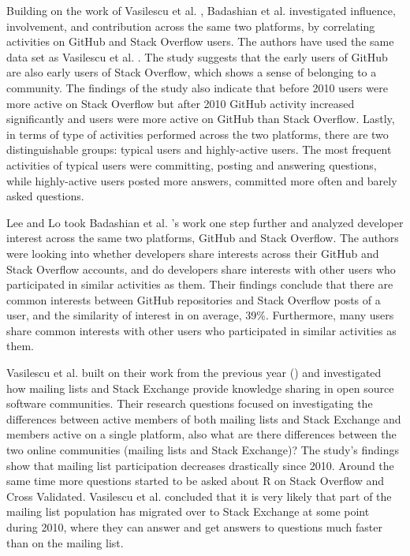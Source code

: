         Building on the work of Vasilescu et al. \cite{vasilescu2013stackoverflow}, Badashian et al. \cite{badashian2014involvement} investigated influence, involvement, and contribution across the same two platforms, by correlating activities on GitHub and Stack Overflow users. The authors have used the same data set as Vasilescu et al. \cite{vasilescu2013stackoverflow}. The study suggests that the early users of GitHub are also early users of Stack Overflow, which shows a sense of belonging to a community. The findings of the study also indicate that before 2010 users were more active on Stack Overflow but after 2010 GitHub activity increased significantly and users were more active on GitHub than Stack Overflow. Lastly, in terms of type of activities performed across the two platforms, there are two distinguishable groups: typical users and highly-active users. The most frequent activities of typical users were committing, posting and answering questions, while highly-active users posted more answers, committed more often and barely asked questions. 
        
        Lee and Lo \cite{lee2017github} took Badashian et al. \cite{badashian2014involvement}'s work one step further and analyzed developer interest across the same two platforms, GitHub and Stack Overflow. The authors were looking into whether developers share interests across their GitHub and Stack Overflow accounts, and do developers share interests with other users who participated in similar activities as them. Their findings conclude that there are common interests between GitHub repositories and Stack Overflow posts of a user, and the similarity of interest in on average, 39\%. Furthermore, many users share common interests with other users who participated in similar activities as them.
        
        Vasilescu et al. \cite{vasilescu2014social} built on their work from the previous year (\cite{vasilescu2013stackoverflow}) and investigated how mailing lists and Stack Exchange provide knowledge sharing in open source software communities. Their research questions focused on investigating the differences between active members of both mailing lists and Stack Exchange and members active on a single platform, also what are there differences between the two online communities (mailing lists and Stack Exchange)? The study's findings show that mailing list participation decreases drastically since 2010. Around the same time more questions started to be asked about R on Stack Overflow and Cross Validated. Vasilescu et al. concluded that it is very likely that part of the mailing list population has migrated over to Stack Exchange at some point during 2010, where they can answer and get answers to questions much faster than on the mailing list.
        
